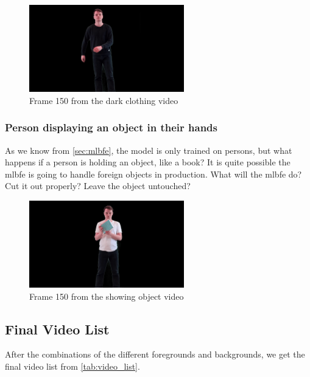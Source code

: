 \begin{figure}[H]
    \centering
    \includegraphics[width=0.6\textwidth]{img/video_frame_150/FG_Rocking-Dark_150.jpg}
    \caption{Frame 150 from the dark clothing video}
    \label{fig:foreground_dark_clothing}
\end{figure}


\subsubsection{Person displaying an object in their hands}
As we know from \autoref{sec:mlbfe}, the model is only trained on persons, but what happens if a person is holding an object, like a book? It is quite possible the \acrshort{mlbfe} is going to handle foreign objects in production. What will the \acrshort{mlbfe} do? Cut it out properly? Leave the object untouched?

\begin{figure}[H]
    \centering
    \includegraphics[width=0.6\textwidth]{img/video_frame_150/FG_Showing-Object_150.jpg}
    \caption{Frame 150 from the showing object video}
    \label{fig:foreground_showing_object}
\end{figure}

\subsection{Final Video List}
After the combinations of the different foregrounds and backgrounds, we get the final video list from \autoref{tab:video_list}.


